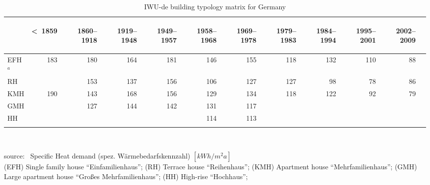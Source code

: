 \begin{table}[htbp]
  \centering
  \caption{IWU-de building typology matrix for Germany}\label{tab:IWU-de}%
    \begin{tabular}{l r rrr rrr rrr r}
    \addlinespace
    \toprule
    &
    \begin{sideways}\textless~1859\end{sideways}&  %
    \begin{sideways}1860--1918\end{sideways}&     %
    \begin{sideways}1919--1948\end{sideways}&     %
    \begin{sideways}1949--1957\end{sideways}&     %
    \begin{sideways}1958--1968\end{sideways}&     %
    \begin{sideways}1969--1978\end{sideways}&     %
    \begin{sideways}1979--1983\end{sideways}&     %
    \begin{sideways}1984--1994\end{sideways}&     %
    \begin{sideways}1995--2001\end{sideways}&     %
    \begin{sideways}2002--2009\end{sideways}\\    %
    \midrule
EFH$^a$&183&180&164&181&146&155&118&132&110&88\\
RH     &   &153&137&156&106&127&127& 98& 78&86\\
KMH    &190&143&168&156&129&134&118&122& 92&79\\
GMH    &   &127&144&142&131&117&   &   &   &  \\
HH     &   &   &   &   &114&113&   &   &   &  \\
    \bottomrule
    \addlinespace
    \end{tabular}\\
    \begin{footnotesize}    
    source:~\cite{Loga.2011} 
    Specific Heat demand (spez. W\"armebedarfskennzahl)
    $[kWh/m^{2}a]$\\
(EFH) Single family house ``Einfamilienhaus'';
(RH) Terrace house ``Reihenhaus'';
(KMH) Apartment house ``Mehrfamilienhaus'';
(GMH) Large apartment house ``Großes Mehrfamilienhaus'';
(HH) High-rise ``Hochhaus'';
    \end{footnotesize}
\end{table}
